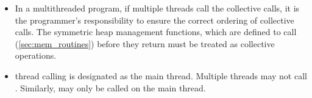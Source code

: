 \begin{itemize}[leftmargin=*]
\item
In a multithreaded \openshmem{} program, if multiple threads call the collective
calls, it is the programmer's responsibility to ensure the correct ordering of
collective calls.  The symmetric heap management functions, which are defined to call
(\ref{sec:mem_routines}) before they return 
must be treated as collective operations.

\item
\openshmem{} thread calling  is designated as the main
thread. Multiple threads may not call . Similarly,
 may only be called on the main thread.

\end{itemize} 
